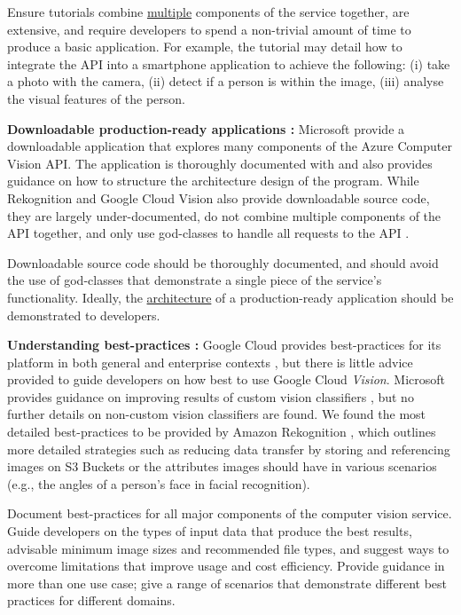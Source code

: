 \begin{leftbar}
\SuggestedImprovement
Ensure tutorials combine \uline{multiple} components of the service together, are extensive, and require developers to spend a non-trivial amount of time to produce a basic application. For example, the tutorial may detail how to integrate the API into a smartphone application to achieve the following: (i) take a photo with the camera, (ii) detect if a person is within the image, (iii) analyse the visual features of the person.
\end{leftbar}

\noindent
\textbf{Downloadable production-ready applications :} Microsoft provide a downloadable application  that explores many components of the Azure Computer Vision API. The application is thoroughly documented with and also provides guidance on how to structure the architecture design of the program. While Rekognition and Google Cloud Vision also provide downloadable source code, they are largely under-documented, do not combine multiple components of the API together, and only use god-classes to handle all requests to the API .

\begin{leftbar}
\SuggestedImprovement
Downloadable source code should be thoroughly documented, and should avoid the use of god-classes that demonstrate a single piece of the service's functionality. Ideally, the \uline{architecture} of a production-ready application should be demonstrated to developers.
\end{leftbar}

\noindent
\textbf{Understanding best-practices :} Google Cloud provides best-practices for its platform in both general and enterprise contexts , but there is little advice provided to guide developers on how best to use Google Cloud \textit{Vision}. Microsoft provides guidance on improving results of custom vision classifiers , but no further details on non-custom vision classifiers are found. We found the most detailed best-practices to be provided by Amazon Rekognition , which outlines more detailed strategies such as reducing data transfer by storing and referencing images on S3 Buckets or the attributes images should have in various scenarios (e.g., the angles of a person's face in facial recognition).

\begin{leftbar}
\SuggestedImprovement
Document best-practices for all major components of the computer vision service. Guide developers on the types of input data that produce the best results, advisable minimum image sizes and recommended file types, and suggest ways to overcome limitations that improve usage and cost efficiency. Provide guidance in more than one use case; give a range of scenarios that demonstrate different best practices for different domains.
\end{leftbar}

